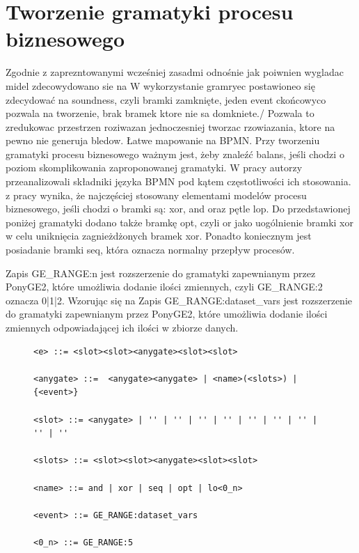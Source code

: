 \section{Tworzenie gramatyki procesu biznesowego}

Zgodnie z zaprezntowanymi wcześniej zasadmi odnośnie jak poiwnien wygladac midel zdecowydowano sie na W wykorzystanie gramryec postawioneo się zdecydować na soundness, czyli bramki zamknięte, jeden event ckońcowyco pozwala na tworzenie, brak bramek ktore nie sa domkniete./ Pozwala to zredukowac przestrzen roziwazan jednoczesniej tworzac rzowiazania, ktore na pewno nie generuja bledow. 
Łatwe mapowanie na BPMN.
Przy tworzeniu gramatyki procesu biznesowego ważnym jest, żeby znaleźć balans, jeśli chodzi o poziom skomplikowania zaproponowanej
gramatyki.  W pracy \cite{10.1007/978-3-540-69534-9_35} autorzy przeanalizowali składniki języka BPMN pod kątem częstotliwości ich stosowania. z pracy wynika, że najczęściej stosowany elementami modelów procesu biznesowego, jeśli chodzi o bramki są: xor, and oraz pętle lop. Do przedstawionej poniżej gramatyki dodano także bramkę opt, czyli or jako uogólnienie bramki xor w celu uniknięcia zagnieżdżonych bramek xor. Ponadto koniecznym jest posiadanie bramki seq, która oznacza normalny przepływ procesów.

Zapis GE{\_}RANGE:n jest rozszerzenie do gramatyki zapewnianym przez PonyGE2, które umożliwia dodanie ilości zmiennych, czyli GE{\_}RANGE:2 oznacza 0|1|2.
Wzorując się na  Zapis GE{\_}RANGE:dataset{\_}vars jest rozszerzenie do gramatyki zapewnianym przez PonyGE2, które umożliwia dodanie ilości zmiennych odpowiadającej ich ilości w zbiorze danych.

\begin{figure}[!ht]
\lstset{caption=Gramatyka procesu biznesowego, captionpos=b}
\lstset{label=src:grammar, frame=single}
\begin{lstlisting}
<e> ::= <slot><slot><anygate><slot><slot>

<anygate> ::=  <anygate><anygate> | <name>(<slots>) | {<event>}

<slot> ::= <anygate> | '' | '' | '' | '' | '' | '' | '' | '' | ''

<slots> ::= <slot><slot><anygate><slot><slot>

<name> ::= and | xor | seq | opt | lo<0_n>

<event> ::= GE_RANGE:dataset_vars

<0_n> ::= GE_RANGE:5
\end{lstlisting}
\end{figure}


